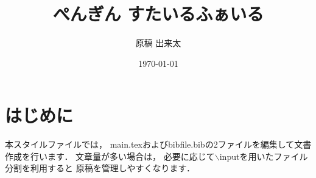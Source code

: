\documentclass[zemi]{sty/penguin}
\begin{document}
\date{\today}
\title{ぺんぎん すたいるふぁいる}
\author{原稿 出来太}
\maketitle

\section{はじめに}
本スタイルファイルでは，
main.texおよびbibfile.bibの2ファイルを編集して文書作成を行います．
文章量が多い場合は，
必要に応じて$\backslash$inputを用いたファイル分割を利用すると
原稿を管理しやすくなります．




\end{document}
